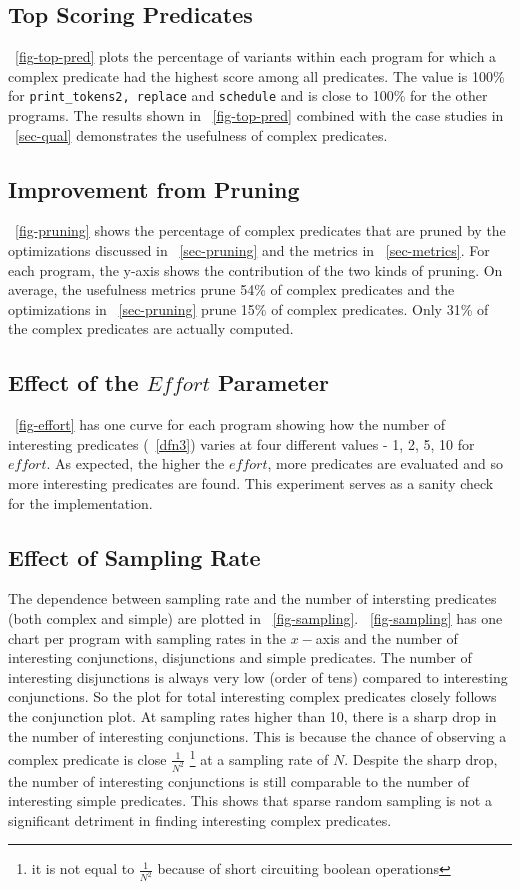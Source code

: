 \subsection{Top Scoring Predicates}
~\autoref{fig-top-pred} plots the percentage of variants within each program for which a complex predicate had the highest score among all predicates.  The value is 100\% for \texttt{print\_tokens2, replace} and \texttt{schedule} and is close to 100\% for the other programs.  The results shown in ~\autoref{fig-top-pred} combined with the case studies in ~\autoref{sec-qual} demonstrates the usefulness of complex predicates.

\subsection{Improvement from Pruning}
~\autoref{fig-pruning} shows the percentage of complex predicates that are pruned by the optimizations discussed in ~\autoref{sec-pruning} and the metrics in ~\autoref{sec-metrics}.  For each program, the y-axis shows the contribution of the two kinds of pruning.  On average, the usefulness metrics prune 54\% of complex predicates and the optimizations in ~\autoref{sec-pruning} prune 15\% of complex predicates.  Only 31\% of the complex predicates are actually computed.

\subsection{Effect of the $Effort$ Parameter}
~\autoref{fig-effort} has one curve for each program showing how the number of interesting predicates (~\autoref{dfn3}) varies at four different values - 1, 2, 5, 10 for $effort$.  As expected, the higher the $effort$, more predicates are evaluated and so more interesting predicates are found.  This experiment serves as a sanity check for the implementation.

\subsection{Effect of Sampling Rate}
\label{sec-sampling}
The dependence between sampling rate and the number of intersting predicates (both complex and simple) are plotted in ~\autoref{fig-sampling}.  ~\autoref{fig-sampling} has one chart per program with sampling rates in the $x-$axis and the number of interesting conjunctions, disjunctions and simple predicates.  The number of interesting disjunctions is always very low (order of tens) compared to interesting conjunctions.  So the plot for total interesting complex predicates closely follows the conjunction plot.  At sampling rates higher than 10, there is a sharp drop in the number of interesting conjunctions.  This is because the chance of observing a complex predicate is close $\frac{1}{N^2}$ {\footnote{it is not equal to $\frac{1}{N^2}$ because of short circuiting boolean operations}} at a sampling rate of $N$.  Despite the sharp drop, the number of interesting conjunctions is still comparable to the number of interesting simple predicates.  This shows that sparse random sampling is not a significant detriment in finding interesting complex predicates.

